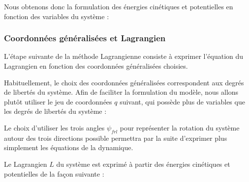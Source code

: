 				
					Nous obtenons donc la formulation des énergies cinétiques et potentielles en fonction des variables du système :
					
					
			
			\subsubsection{Coordonnées généralisées et Lagrangien}
			
				L'étape suivante de la méthode Lagrangienne consiste à exprimer l'équation du Lagrangien en fonction des coordonnées généralisées choisies.
				
				Habituellement, le choix des coordonnées généralisées correspondent aux degrés de libertés du système. 
				Afin de faciliter la formulation du modèle, nous allons plutôt utiliser le jeu de coordonnées $q$ suivant, qui possède plus de variables que les degrés de libertés du système :
								
				Le choix d'utiliser les trois angles $\psi_{frl}$ pour représenter la rotation du système autour des trois directions possible permettra par la suite d'exprimer plus simplement les équations de la dynamique.
				
				
				Le Lagrangien $L$ du système est exprimé à partir des énergies cinétiques et potentielles de la façon suivante :
				
